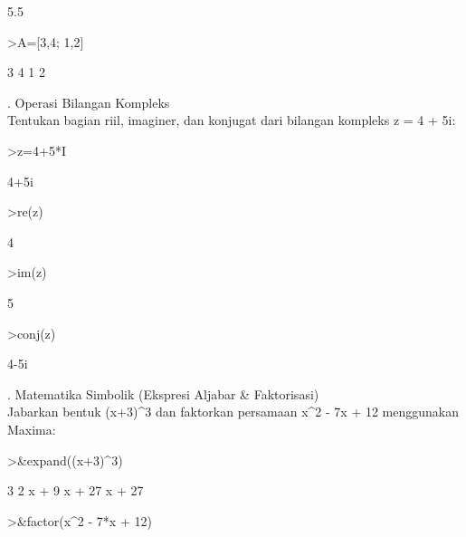 \documentclass{article}
\newenvironment{eulernotebook}{\par}{\par}
\newenvironment{eulercomment}{\par\medskip}{\par\medskip}
\begin{document}
\begin{eulernotebook}
\begin{euleroutput}
  5.5
\end{euleroutput}
\begin{eulerprompt}
>A=[3,4; 1,2]
\end{eulerprompt}
\begin{euleroutput}
              3             4 
              1             2 
\end{euleroutput}
\begin{eulercomment}
4. Operasi Bilangan Kompleks\\
Tentukan bagian riil, imaginer, dan konjugat dari bilangan kompleks z
= 4 + 5i:
\end{eulercomment}
\begin{eulerprompt}
>z=4+5*I
\end{eulerprompt}
\begin{euleroutput}
  4+5i
\end{euleroutput}
\begin{eulerprompt}
>re(z)
\end{eulerprompt}
\begin{euleroutput}
  4
\end{euleroutput}
\begin{eulerprompt}
>im(z)
\end{eulerprompt}
\begin{euleroutput}
  5
\end{euleroutput}
\begin{eulerprompt}
>conj(z)
\end{eulerprompt}
\begin{euleroutput}
  4-5i
\end{euleroutput}
\begin{eulercomment}
5. Matematika Simbolik (Ekspresi Aljabar \& Faktorisasi)\\
Jabarkan bentuk (x+3)\textasciicircum{}3 dan faktorkan persamaan x\textasciicircum{}2 - 7x + 12
menggunakan Maxima:
\end{eulercomment}
\begin{eulerprompt}
>&expand((x+3)^3)
\end{eulerprompt}
\begin{euleroutput}
  
                           3      2
                          x  + 9 x  + 27 x + 27
  
\end{euleroutput}
\begin{eulerprompt}
>&factor(x^2 - 7*x + 12)
\end{eulerprompt}
\begin{euleroutput}
  

\end{euleroutput}
\end{eulernotebook}
\end{document}
